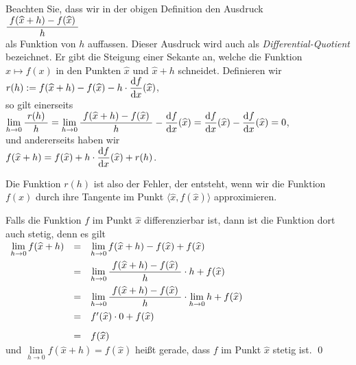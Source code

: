 \remark
Beachten Sie, dass wir in der obigen Definition den Ausdruck
\\[0.3cm]
\hspace*{1.3cm} $\displaystyle\frac{\;\displaystyle f(\widehat{x} + h) - f(\widehat{x})\;}{\;\displaystyle h\;}$ \\[0.3cm]
als Funktion von $h$ auffassen.  Dieser Ausdruck wird auch als \emph{Differential-Quotient}
bezeichnet.  Er gibt die Steigung einer Sekante an, welche die Funktion $x \mapsto f(x)$
in den Punkten $\widehat{x}$ und $\widehat{x} + h$ schneidet.  Definieren wir 
\\[0.3cm]
\hspace*{1.3cm}
$r(h) := f(\widehat{x} + h) - f(\widehat{x}) - h \cdot \displaystyle\frac{\textrm{d}f}{\textrm{d}x}(\widehat{x})$,
\\[0.3cm]
so gilt einerseits 
\\[0.3cm]
\hspace*{1.3cm}
$\lim\limits_{h \rightarrow 0} \displaystyle\frac{\;\displaystyle r(h)\;}{\;\displaystyle h\;} = 
 \lim\limits_{h \rightarrow 0} \displaystyle\frac{\;\displaystyle f(\widehat{x} + h) -
  f(\widehat{x})\;}{\;\displaystyle h\;} - \displaystyle\frac{\textrm{d}f}{\textrm{d}x}(\widehat{x}) = \displaystyle\frac{\textrm{d}f}{\textrm{d}x}(\widehat{x}) - \displaystyle\frac{\textrm{d}f}{\textrm{d}x}(\widehat{x}) = 0$,
\\[0.3cm]
und andererseits haben wir 
\\[0.3cm]
\hspace*{1.3cm}
$f(\widehat{x} + h) = f(\widehat{x}) + h \cdot \displaystyle\frac{\textrm{d}f}{\textrm{d}x}(\widehat{x}) + r(h)$.
\pagebreak

\noindent
Die Funktion $r(h)$ ist also der Fehler, der entsteht, wenn wir die Funktion $f(x)$ durch ihre
Tangente im Punkt $\bigl\langle\widehat{x}, f(\widehat{x})\bigr\rangle$ approximieren.  \eox


\remark
Falls die Funktion $f$ im Punkt $\widehat{x}$ differenzierbar ist,
dann ist die Funktion dort auch stetig, denn es gilt 
\\[0.3cm]
\hspace*{1.3cm}
$
\begin{array}[t]{lcl}
\lim\limits_{h \rightarrow 0} f(\widehat{x}+h) & = &
 \lim\limits_{h \rightarrow 0} f(\widehat{x}+h) - f(\widehat{x}) + f(\widehat{x}) \\[0.3cm]
& = & \lim\limits_{h \rightarrow 0} \displaystyle\frac{\;\displaystyle f(\widehat{x}+h) - f(\widehat{x})\;}{\;\displaystyle h\;} \cdot h + f(\widehat{x}) \\[0.3cm]
& = & \lim\limits_{h \rightarrow 0} \displaystyle\frac{\;\displaystyle f(\widehat{x}+h) - f(\widehat{x})\;}{\;\displaystyle h\;} \cdot \lim\limits_{h \rightarrow 0} h + f(\widehat{x}) \\[0.3cm]
& = & f'(\widehat{x}) \cdot 0 + f(\widehat{x}) \\[0.3cm]
& = & f(\widehat{x})
\end{array}
$
\\[0.3cm]
und $\lim\limits_{h \rightarrow 0} f(\widehat{x}+h) = f(\widehat{x})$ hei{\ss}t gerade, dass $f$
im Punkt $\widehat{x}$ stetig ist. \qed
\vspace*{0.3cm}

